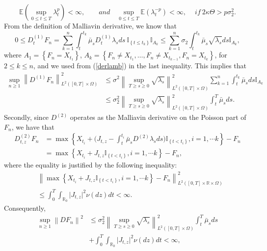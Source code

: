 \documentclass[11pt]{article}
\numberwithin{equation}{section}
\begin{document}
\begin{equation}\label{suplambda}
	\mathbb{E}(\sup_{0 \leq t \leq T} \lambda_t ^p) <\infty,  \quad    \quad  and   \quad  \sup_{0 \leq t \leq T}\mathbb{E}(\lambda_t ^{-p}) <\infty, \quad~if ~  2\kappa\Theta > p\sigma_2^2.
\end{equation}
From the definition of Malliavin derivative, we know that 
$$
0 \leq D_{t}^{(1)} F_{n}=\sum_{k=1}^{n} \int_t^{t_k} \bar{\mu}_s D_{t}^{(1)} \lambda_s ds \ \mathbb{I}_{\left\{t \leq t_{k}\right\}} \mathbb{I}_{A_{k}} \leq \sum_{k=1}^{n} \sigma_2 \int_t^{t_k} \bar{\mu}_s \sqrt{\lambda_s} ds \mathbb{I}_{A_{k}},
$$
where $A_{1}=\left\{F_{n}=X_{t_{1}}\right\}$, $A_{k}=\left\{F_{n} \neq X_{t_{1}}, \ldots, F_{n} \neq X_{t_{k-1}}, F_{n}=X_{t_{k}}\right\}$, for $2 \leq k \leq n$, and we used from (\ref{derlamb}) in the last inequality. This implies that 
\begin{align*}
\sup _{n \geq 1}\left\|D^{(1)} F_{n}\right\|_{L^{2}([0, T] \times \Omega)}^{2} & \leq \sigma^{2} \left\|\sup _{T \geq s \geq 0}  \sqrt{\lambda_s}\right\|_{L^{2}([0, T] \times \Omega)}^{2}  \sum_{k=1}^{n}\int_t^{t_k} \bar{\mu}_s  ds \mathbb{I}_{A_{k}} \\
&\leq \sigma_2^{2} \left\|\sup _{T \geq s \geq 0}  \sqrt{\lambda_s}\right\|_{L^{2}([0, T] \times \Omega)}^{2}\int_t^{T} \bar{\mu}_s  ds  .
\end{align*} 
Secondly, since $D^{(2)}$ operates as the Malliavin derivative on the Poisson part of $F_{n}$, we have that
\begin{align*}
D_{t, z}^{(2)} F_{n}&=\max \left\{X_{t_{i}}+\big(J_{t,z}-\int_t^{t_i} \bar{\mu}_s D^{(2)}\lambda_s ds\big)\mathbb{I}_{\left\{t<t_{i}\right\}}, i=1,\cdots k\right\}-F_{n}\\
& =\max \left\{X_{t_{i}}+J_{t,z}\mathbb{I}_{\left\{t<t_{i}\right\}}, i=1,\cdots k\right\}-F_{n},
\end{align*}
where the equality is justified by the following inequality:
\begin{align*}
&\left\|\max \left\{X_{t_{i}} +J_{t,z}\mathbb{I}_{\left\{t<t_{i}\right\}}, i=1,\cdots k\right\}-F_{n}\right\|_{L^{2}([0, T] \times \mathbb{R} \times \Omega)}^{2}\\ 
&\leq \int_0^T \int_{\mathbb{R}_{0}}\vert  J_{t,z}\vert^2 \nu(d z)dt < \infty.
\end{align*}
Consequently, 
\begin{align*}
\sup _{n \geq 1}\left\|D F_{n}\right\|^{2} &\leq  \sigma_2^{2} \left\|\sup _{T \geq s \geq 0}  \sqrt{\lambda_s}\right\|_{L^{2}([0, T] \times \Omega)}^{2}\int_t^{T} \bar{\mu}_s  ds \\
& +  \int_0^T \int_{\mathbb{R}_{0}} \vert J_{t,z} \vert^2 \nu(d z)dt < \infty,
\end{align*}
\end{document}
